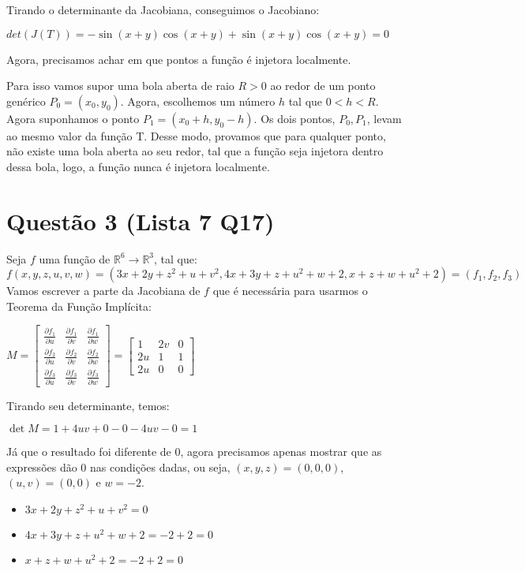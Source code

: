 \documentclass[11pt]{article}
\begin{document}
Tirando o determinante da Jacobiana, conseguimos o
Jacobiano:

\(det(J(T)) = -\sin{(x+y)\cos{(x+y)}} + \sin{(x+y)}\cos{(x+y)} = 0\)

Agora, precisamos achar em que pontos a 
função é injetora localmente.

Para isso vamos supor uma bola aberta de raio \(R > 0\)
ao redor de um ponto genérico \(P_0 = (x_0, y_0)\). Agora,
escolhemos um número \(h\) tal que \(0< h <R\). Agora
suponhamos o ponto \(P_1 = (x_0+h, y_0-h)\).
Os dois pontos, \(P_0, P_1\), levam ao mesmo valor da função T.
Desse modo, provamos que para qualquer ponto, não existe
uma bola aberta ao seu redor, tal que a função seja
injetora dentro dessa bola, logo, a função nunca é injetora localmente.
\section{Questão 3 (Lista 7 Q17)}
\label{sec:orgd620d4e}
Seja \(f\) uma função de \(\mathbb{R}^6\to\mathbb{R}^3\), 
tal que:\\
\(f(x, y, z, u, v, w) = (3x+2y+z^2+u+v^2, 4x+3y+z+u^2+w+2, x+z+w+u^2+2) = (f_1, f_2, f_3)\)
Vamos escrever a parte da Jacobiana de \(f\) que é necessária
para usarmos o Teorema da Função Implícita:

\(\displaystyle M = 
  \begin{bmatrix}
  \frac{\partial{f_1}}{\partial{u}} & \frac{\partial{f_1}}{\partial{v}} & \frac{\partial{f_1}}{\partial{w}} \\
  \frac{\partial{f_2}}{\partial{u}} & \frac{\partial{f_2}}{\partial{v}} & \frac{\partial{f_2}}{\partial{w}} \\
  \frac{\partial{f_3}}{\partial{u}} & \frac{\partial{f_3}}{\partial{v}} & \frac{\partial{f_3}}{\partial{w}}
  \end{bmatrix} = 
  \begin{bmatrix}
  1 & 2v & 0 \\
  2u & 1 & 1 \\
  2u & 0 & 0 
  \end{bmatrix}\)

Tirando seu determinante, temos:

\(\det{M} = 1 + 4uv + 0 - 0 - 4uv - 0 = 1\)

Já que o resultado foi diferente de 0, agora precisamos
apenas mostrar que as expressões dão 0 nas condições
dadas, ou seja, 
\((x, y, z) = (0, 0, 0)\), \((u, v) = (0, 0)\) e \(w = -2\).

\begin{itemize}
\item \(3x+2y+z^2+u+v^2 = 0\)
\item \(4x+3y+z+u^2+w+2 = -2+2 = 0\)
\item \(x+z+w+u^2+2 = -2+2 = 0\)
\end{itemize}
\end{document}
